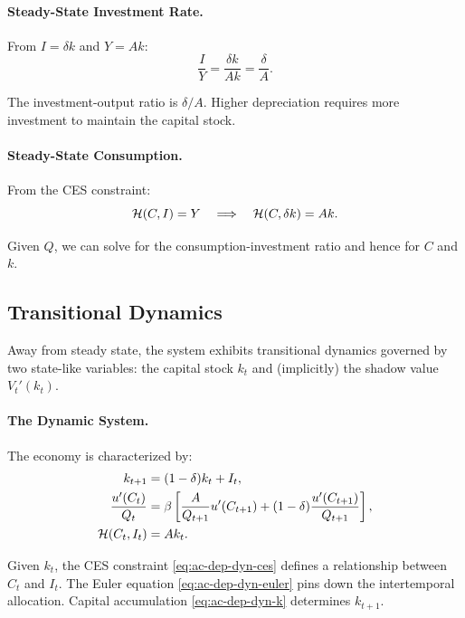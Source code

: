 \paragraph{Steady-State Investment Rate.}
From $I = \delta k$ and $Y = Ak$:
\begin{equation}
\frac{I}{Y} = \frac{\delta k}{A k} = \frac{\delta}{A}.
\label{eq:ac-dep-inv-rate}
\end{equation}

The investment-output ratio is $\delta / A$. Higher depreciation requires more investment to maintain the capital stock.

\paragraph{Steady-State Consumption.}
From the CES constraint:
\begin{equation}
\mathcal{H}(C, I) = Y \quad \Longrightarrow \quad \mathcal{H}(C, \delta k) = A k.
\label{eq:ac-dep-ss-ces}
\end{equation}

Given $Q$, we can solve for the consumption-investment ratio and hence for $C$ and $k$.

\subsection{Transitional Dynamics}
\label{subsec:ac-dep-dynamics}

Away from steady state, the system exhibits transitional dynamics governed by two state-like variables: the capital stock $k_t$ and (implicitly) the shadow value $V_t'(k_t)$.

\paragraph{The Dynamic System.}
The economy is characterized by:
\begin{align}
k_{t+1} &= (1-\delta) k_t + I_t, \label{eq:ac-dep-dyn-k} \\
\frac{u'(C_t)}{Q_t} &= \beta \left[ \frac{A}{Q_{t+1}} u'(C_{t+1}) + (1-\delta) \frac{u'(C_{t+1})}{Q_{t+1}} \right], \label{eq:ac-dep-dyn-euler} \\
\mathcal{H}(C_t, I_t) &= A k_t. \label{eq:ac-dep-dyn-ces}
\end{align}

Given $k_t$, the CES constraint \cref{eq:ac-dep-dyn-ces} defines a relationship between $C_t$ and $I_t$. The Euler equation \cref{eq:ac-dep-dyn-euler} pins down the intertemporal allocation. Capital accumulation \cref{eq:ac-dep-dyn-k} determines $k_{t+1}$.

